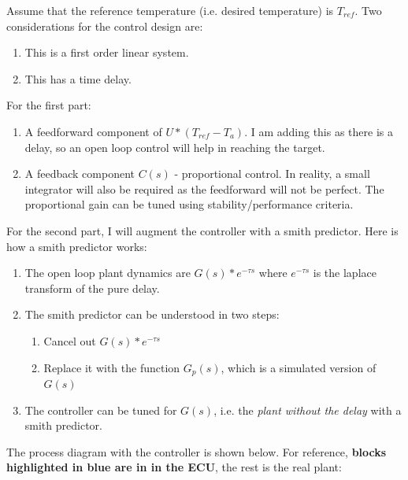 Assume that the reference temperature (i.e. desired temperature) is \(T_{ref}\).
\noindent
\newline
\newline
Two considerations for the control design are:
\begin{enumerate}
  \item This is a first order linear system.
  \item This has a time delay.
\end{enumerate}
\noindent
For the first part:
\begin{enumerate}
  \item A feedforward component of \(U*(T_{ref} - T_a)\). I am adding this as there is a delay, so an open loop control will help in reaching the target.
  \item A feedback component \(C(s)\) - proportional control. In reality, a small integrator will also be required as the feedforward will not be perfect. The proportional gain can be tuned using stability/performance criteria.
\end{enumerate}
For the second part, I will augment the controller with a smith predictor. Here is how a smith predictor works:
\begin{enumerate}
  \item The open loop plant dynamics are \(G(s)*e^{-\tau s}\) where \(e^{-\tau s}\) is the laplace transform of the pure delay.
  \item The smith predictor can be understood in two steps:
  \begin{enumerate}
  \item Cancel out \(G(s)*e^{-\tau s}\)
  \item Replace it with the function \(G_p(s)\), which is a simulated version of \(G(s)\)
  \end{enumerate}
  \item The controller can be tuned for \(G(s)\), i.e. the \textit{plant without the delay} with a smith predictor.
\end{enumerate}

\noindent
\newline
The process diagram with the controller is shown below. For reference, \textbf{blocks highlighted in \textcolor{TealBlue}{blue} are in in the ECU}, the rest is the real plant: \\

